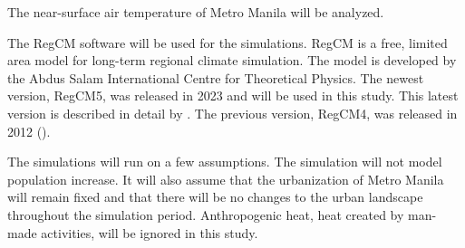 	The near-surface air temperature of Metro Manila will be analyzed.
	
	The RegCM software will be used for the simulations.
	RegCM is a free, limited area model for long-term regional climate simulation.
	The model is developed by the Abdus Salam International Centre for Theoretical Physics.
	The newest version, RegCM5, was released in 2023 and will be used in this study.
	This latest version is described in detail by \textcite{Giorgi2023}. 
	The previous version, RegCM4, was released in 2012 (\textcite{Giorgi2012}).
	
	The simulations will run on a few assumptions.
	The simulation will not model population increase.
	It will also assume that the urbanization of Metro Manila will remain fixed and that there will be no changes to the urban landscape throughout the simulation period.
	Anthropogenic heat, heat created by man-made activities, will be ignored in this study.